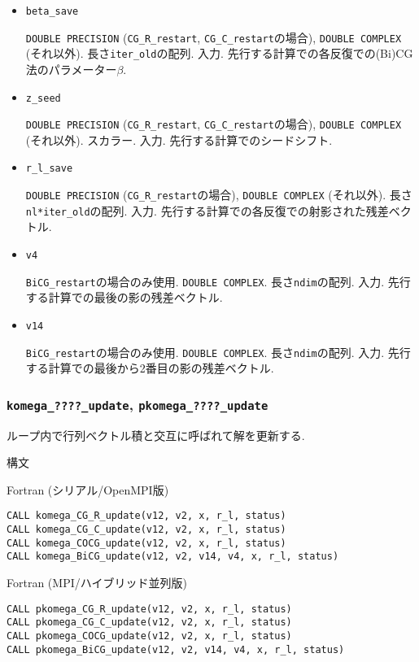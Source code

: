 \documentclass[12pt,titlepage]{jarticle}
\begin{document}
\begin{itemize}
\item \verb|beta_save|

  \verb|DOUBLE PRECISION| (\verb|CG_R_restart|, \verb|CG_C_restart|の場合),
  \verb|DOUBLE COMPLEX| (それ以外).
  長さ\verb|iter_old|の配列. 入力. 先行する計算での各反復での(Bi)CG法のパラメーター$\beta$.

\item \verb|z_seed|

  \verb|DOUBLE PRECISION| (\verb|CG_R_restart|, \verb|CG_C_restart|の場合),
  \verb|DOUBLE COMPLEX| (それ以外).
  スカラー. 入力. 先行する計算でのシードシフト.

\item \verb|r_l_save|
  
  \verb|DOUBLE PRECISION| (\verb|CG_R_restart|の場合),
  \verb|DOUBLE COMPLEX| (それ以外).
  長さ\verb|nl*iter_old|の配列. 入力.
  先行する計算での各反復での射影された残差ベクトル.

\item \verb|v4|

  \verb|BiCG_restart|の場合のみ使用.
  \verb|DOUBLE COMPLEX|.
  長さ\verb|ndim|の配列. 入力.
  先行する計算での最後の影の残差ベクトル.

\item \verb|v14|

  \verb|BiCG_restart|の場合のみ使用.
  \verb|DOUBLE COMPLEX|.
  長さ\verb|ndim|の配列. 入力.
  先行する計算での最後から2番目の影の残差ベクトル.

\end{itemize}

\subsubsection{\texttt{komega\_????\_update}, \texttt{pkomega\_????\_update}}

ループ内で行列ベクトル積と交互に呼ばれて解を更新する.

\noindent 構文

\noindent Fortran (シリアル/OpenMPI版)
\begin{verbatim}
CALL komega_CG_R_update(v12, v2, x, r_l, status)
CALL komega_CG_C_update(v12, v2, x, r_l, status)
CALL komega_COCG_update(v12, v2, x, r_l, status)
CALL komega_BiCG_update(v12, v2, v14, v4, x, r_l, status)
\end{verbatim}

\noindent Fortran (MPI/ハイブリッド並列版)
\begin{verbatim}
CALL pkomega_CG_R_update(v12, v2, x, r_l, status)
CALL pkomega_CG_C_update(v12, v2, x, r_l, status)
CALL pkomega_COCG_update(v12, v2, x, r_l, status)
CALL pkomega_BiCG_update(v12, v2, v14, v4, x, r_l, status)
\end{verbatim}
\end{document}

